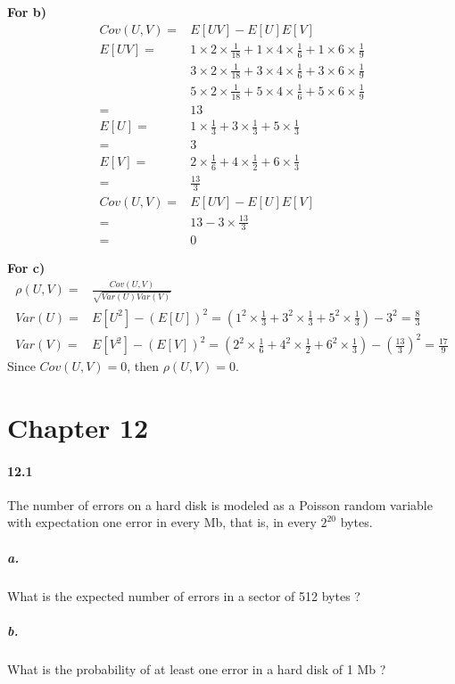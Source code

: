 \documentclass[11pt]{article} %
\begin{document}
{\bf For b)} \\
\begin{align*}
Cov(U, V) = &  E[UV] - E[U]E[V] \\
E[UV] = & 1\times 2 \times \frac{1}{18} + 1\times 4 \times \frac{1}{6} + 1\times 6 \times \frac{1}{9} \\
& 3\times 2 \times \frac{1}{18} + 3\times 4 \times \frac{1}{6} + 3\times 6 \times \frac{1}{9}  \\
& 5\times 2 \times \frac{1}{18} + 5\times 4 \times \frac{1}{6} + 5 \times 6 \times \frac{1}{9}  \\
= & 13 \\
E[U] = & 1\times \frac{1}{3} + 3\times \frac{1}{3} + 5\times \frac{1}{3} \\
= & 3 \\
E[V] = &  2\times \frac{1}{6} + 4\times \frac{1}{2} + 6\times \frac{1}{3} \\
= & \frac{13}{3} \\
Cov(U, V) = & E[UV] - E[U]E[V] \\
= & 13 - 3\times \frac{13}{3} \\
= & 0
\end{align*}


{\bf For c)} \\
\begin{align*}
\rho(U, V) = & \frac{Cov(U, V)}{\sqrt{Var(U)Var(V)}}\\
Var(U) = & E[U^2] - (E[U])^2 =  \left( 1^2\times \frac{1}{3} + 3^2\times \frac{1}{3} + 5^2\times \frac{1}{3} \right) - 3^2 = \frac{8}{3} \\
Var(V) = & E[V^2] - (E[V])^2 = \left(  2^2\times \frac{1}{6} + 4^2\times \frac{1}{2} + 6^2\times \frac{1}{3}\right) - \left(\frac{13}{3}\right)^2 = \frac{17}{9}
\end{align*}
Since $Cov(U, V) = 0$, then $\rho(U, V) = 0$.
 
\section{Chapter 12}

\paragraph*{12.1} The number of errors on a hard disk is modeled as a Poisson random variable with expectation one error in every Mb, that is, in every $2^{20}$ bytes.
\subparagraph*{a.} What is the expected number of errors in a sector of 512 bytes ?
\subparagraph*{b.} What is the probability of at least one error in a hard disk of 1 Mb ?
\end{document}
